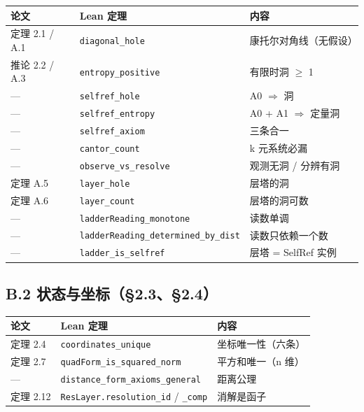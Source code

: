 \documentclass[11pt,a4paper]{ctexart}
\begin{document}
\begin{center}\small
\begin{tabular}{lll}
\toprule
论文 & Lean 定理 & 内容 \\
\midrule
定理 2.1 / A.1 & \texttt{diagonal\_hole} & 康托尔对角线（无假设） \\
推论 2.2 / A.3 & \texttt{entropy\_positive} & 有限时洞 \ensuremath{\ge} 1 \\
— & \texttt{selfref\_hole} & A0 \ensuremath{\Longrightarrow} 洞 \\
— & \texttt{selfref\_entropy} & A0 + A1 \ensuremath{\Longrightarrow} 定量洞 \\
— & \texttt{selfref\_axiom} & 三条合一 \\
— & \texttt{cantor\_count} & k 元系统必漏 \\
— & \texttt{observe\_vs\_resolve} & 观测无洞 / 分辨有洞 \\
定理 A.5 & \texttt{layer\_hole} & 层塔的洞 \\
定理 A.6 & \texttt{layer\_count} & 层塔的洞可数 \\
— & \texttt{ladderReading\_monotone} & 读数单调 \\
— & \texttt{ladderReading\_determined\_by\_dist} & 读数只依赖一个数 \\
— & \texttt{ladder\_is\_selfref} & 层塔 = SelfRef 实例 \\
\bottomrule
\end{tabular}
\end{center}

\subsection{B.2 状态与坐标（§2.3、§2.4）}

\begin{center}\small
\begin{tabular}{lll}
\toprule
论文 & Lean 定理 & 内容 \\
\midrule
定理 2.4 & \texttt{coordinates\_unique} & 坐标唯一性（六条） \\
定理 2.7 & \texttt{quadForm\_is\_squared\_norm} & 平方和唯一（n 维） \\
— & \texttt{distance\_form\_axioms\_general} & 距离公理 \\
定理 2.12 & \texttt{ResLayer.resolution\_id} / \texttt{\_comp} & 消解是函子 \\
\bottomrule
\end{tabular}
\end{center}
\end{document}
